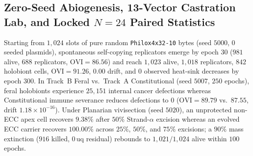 \documentclass[11pt,reqno]{amsart}
\theoremstyle{plain}
\theoremstyle{definition}
\theoremstyle{remark}
\newcommand{\code}[1]{{\footnotesize\nolinkurl{#1}}}
\begin{document}
\subsection{Zero-Seed Abiogenesis, 13-Vector Castration Lab, and Locked $N=24$ Paired Statistics}
Starting from $1{,}024$ slots of pure random \code{Philox4x32-10} bytes (seed $5000$, $0$ seeded plasmids), spontaneous self-copying replicators emerge by epoch $30$ ($981$ alive, $688$ replicators, $\mathrm{OVI}=86.56$) and reach $1{,}023$ alive, $1{,}018$ replicators, $842$ holobiont cells, $\mathrm{OVI}=91.26$, $0.00$ drift, and $0$ observed heat-sink decreases by epoch $300$. In Track~B Feral vs.\ Track~A Constitutional (seed $5007$, $250$ epochs), feral holobionts experience $25{,}151$ internal cancer defections whereas Constitutional immune severance reduces defections to $0$ ($\mathrm{OVI}=89.79$ vs.\ $87.55$, drift $1.18 \times 10^{-16}$). Under Planarian vivisection (seed $5020$), an unprotected non-ECC apex cell recovers $9.38\%$ after $50\%$ Strand-$\alpha$ excision whereas an evolved ECC carrier recovers $100.00\%$ across $25\%$, $50\%$, and $75\%$ excisions; a $90\%$ mass extinction ($916$ killed, $0\,\mathrm{uq}$ residual) rebounds to $1{,}021/1{,}024$ alive within $100$ epochs.
\end{document}
